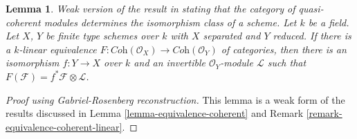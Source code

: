 \documentclass[10pt,a4paper]{amsart}
\newenvironment{reference}{\comment}{\endcomment}
\theoremstyle{plain}
\newtheorem{lemma}[subsection]{Lemma}
\theoremstyle{definition}
\theoremstyle{remark}
\numberwithin{equation}{subsection}
\begin{document}
\begin{lemma}
\label{lemma-equivalence-coherent-over-field}
\begin{reference}
Weak version of the result in \cite{Gabriel}
stating that the category of quasi-coherent modules
determines the isomorphism class of a scheme.
\end{reference}
Let $k$ be a field. Let $X$, $Y$ be finite type schemes over $k$ with
$X$ separated and $Y$ reduced. If there is a $k$-linear equivalence
$F : \textit{Coh}(\mathcal{O}_X) \to \textit{Coh}(\mathcal{O}_Y)$
of categories, then there is an isomorphism $f : Y \to X$
over $k$ and an invertible $\mathcal{O}_Y$-module $\mathcal{L}$
such that $F(\mathcal{F}) = f^*\mathcal{F} \otimes \mathcal{L}$.
\end{lemma}

\begin{proof}[Proof using Gabriel-Rosenberg reconstruction]
This lemma is a weak form of the results discussed in
Lemma \ref{lemma-equivalence-coherent} and
Remark \ref{remark-equivalence-coherent-linear}.
\end{proof}
\end{document}
